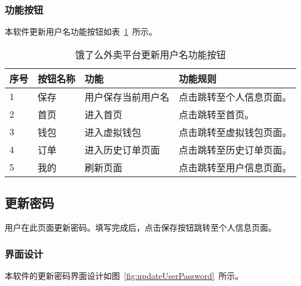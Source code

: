 \subsubsection{功能按钮}
本软件更新用户名功能按钮如表~\ref{tab:table17}~所示。
\begin{table}[htbp]
    \caption{饿了么外卖平台更新用户名功能按钮}\label{tab:table17}
    \vspace{0.5em}\wuhao
    \begin{tabularx}{\textwidth}{lllX}
    \toprule[1.5pt]
    序号 & 按钮名称 & 功能 & 功能规则 \\ 
    \midrule[1pt]
    1 & 保存 & 用户保存当前用户名 & 点击跳转至个人信息页面。 \\
    2 & 首页 & 进入首页 & 点击跳转至首页。 \\
    3 & 钱包 & 进入虚拟钱包 & 点击跳转至虚拟钱包页面。 \\
    4 & 订单 & 进入历史订单页面 & 点击跳转至历史订单页面。 \\
    5 & 我的 & 刷新页面 & 点击跳转至用户信息页面。 \\
\bottomrule[1.5pt]
\end{tabularx}
\vspace{\baselineskip}
\end{table}

\subsection{更新密码}
用户在此页面更新密码。填写完成后，点击保存按钮跳转至个人信息页面。
\subsubsection{界面设计}
本软件的更新密码界面设计如图~\ref{fig:updateUserPassword}~所示。
